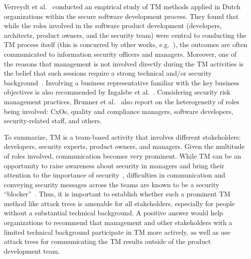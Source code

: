 Verreydt et al.~\cite{verreydt2024threat} conducted an empirical study of TM methods applied in Dutch organizations within the secure software development process. They found that while the roles involved in the software product development (developers, architects, product owners, and the security team) were central to conducting the TM process itself (this is concurred by other works, e.g.~\cite{shostack2008experiences, bernsmed2022adopting,cruzes2018challenges,dhillon2011developer,trentinaglia2023eliciting}), the outcomes are often communicated to information security officers and managers. Moreover, one of the reasons that management is not involved directly during the TM activities is the belief that such sessions require a strong technical and/or security background~\cite{verreydt2024threat}. Involving a business representative familiar with the key business objectives is also recommended by Ingalsbe et al.~\cite{ingalsbe2008threat}.  Considering security risk management practices, Brunner et al.~\cite{brunner2020risk} also report on the heterogeneity of roles being involved: CxOs, quality and compliance managers, software developers, security-related staff, and others. 

To summarize, TM is a team-based activity that involves different stakeholders: developers, security experts, product owners, and managers. Given the multitude of roles involved, communication becomes very prominent. While TM can be an opportunity to raise awareness about security in managers and bring their attention to the importance of security~\cite{cruzes2018challenges,verreydt2024threat}, difficulties in communication and conveying security messages across the teams are known to be a security ``blocker''~\cite{weir2023incorporating,verreydt2024threat}. Thus, it is important to establish whether such a prominent TM method like attack trees is amenable for all stakeholders, especially for people without a substantial technical background. A positive answer would help organizations to recommend that management and other stakeholders with a limited technical background participate in TM more actively, as well as use attack trees for communicating the TM results outside of the product development team.





